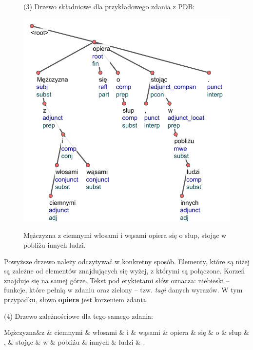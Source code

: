 \documentclass[licencjacka]{pracamgr_Kogni}
\begin{document}
\begin{figure}
    \hspace{0.7cm}(3) Drzewo składniowe dla przykładowego zdania z PDB:

    \includegraphics{drzewko.pdf}

    Mężczyzna z ciemnymi włosami i wąsami opiera się o słup, stojąc w pobliżu innych ludzi.
\end{figure}

Powyższe drzewo należy odczytywać w konkretny sposób. Elementy, które są niżej są zależne od elementów znajdujących się wyżej, z którymi są połączone. Korzeń znajduje się na samej górze. Tekst pod etykietami słów oznacza: niebieski -- funkcje, które pełnią w zdaniu oraz zielony -- tzw. \textit{tagi} danych wyrazów. W tym przypadku, słowo \textbf{opiera} jest korzeniem zdania.

(4) Drzewo zależnościowe dla tego samego zdania:

\begin{dependency}[theme=simple, label style = {text = blue}]
    \hspace{-2.5cm}
    \begin{deptext}[column sep=0.1cm]
Mężczyzna\&z \& ciemnymi \& włosami \& i \& wąsami \& opiera \& się \& o \& słup \& , \& stojąc \& w \& pobliżu \& innych \& ludzi \& . \\
    \end{deptext}
\end{dependency}
\end{document}
